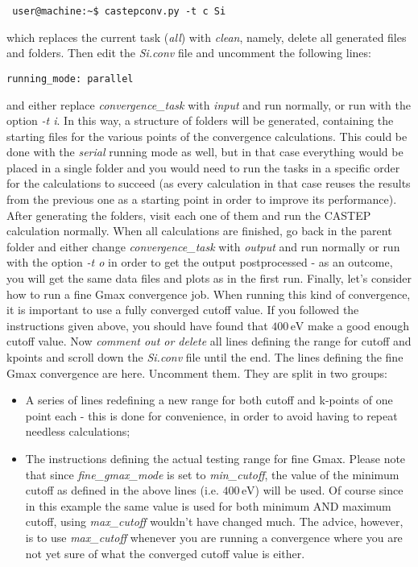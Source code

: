 \documentclass[10pt]{article}
\begin{document}
\begin{lstlisting}
 user@machine:~$ castepconv.py -t c Si
\end{lstlisting}

which replaces the current task (\textit{all}) with \textit{clean}, namely, delete all generated files and folders. Then edit the \textit{Si.conv} file and uncomment the following lines:

\begin{lstlisting}
running_mode: parallel
\end{lstlisting}

and either replace \textit{convergence\_task} with \textit{input} and run normally, or run with the option \textit{-t i}. In this way, a structure of folders will be generated, containing the starting files for the various points of the convergence calculations. This could be done with the \textit{serial} running mode as well, but in that case everything would be placed in a single folder and you would need to run the tasks in a specific order for the calculations to succeed (as every calculation in that case reuses the results from the previous one as a starting point in order to improve its performance). After generating the folders, visit each one of them and run the CASTEP calculation normally. When all calculations are finished, go back in the parent folder and either change \textit{convergence\_task} with \textit{output} and run normally or run with the option \textit{-t o} in order to get the output postprocessed - as an outcome, you will get the same data files and plots as in the first run.\newline
Finally, let's consider how to run a fine Gmax convergence job. When running this kind of convergence, it is important to use a fully converged cutoff value. If you followed the instructions given above, you should have found that $400\,\mathrm{eV}$ make a good enough cutoff value. Now \textit{comment out or delete} all lines defining the range for cutoff and kpoints and scroll down the \textit{Si.conv} file until the end. The lines defining the fine Gmax convergence are here. Uncomment them. They are split in two groups:

\begin{itemize}
 \item A series of lines redefining a new range for both cutoff and k-points of one point each - this is done for convenience, in order to avoid having to repeat needless calculations;
 \item The instructions defining the actual testing range for fine Gmax. Please note that since \textit{fine_gmax_mode} is set to \textit{min_cutoff}, the value of the minimum cutoff as defined in the above lines (i.e. $400\,\mathrm{eV}$) will be used. Of course since in this example the same value is used for both minimum AND maximum cutoff, using \textit{max_cutoff} wouldn't have changed much. The advice, however, is to use \textit{max_cutoff} whenever you are running a convergence where you are not yet sure of what the converged cutoff value is either.
\end{itemize}
\end{document}
